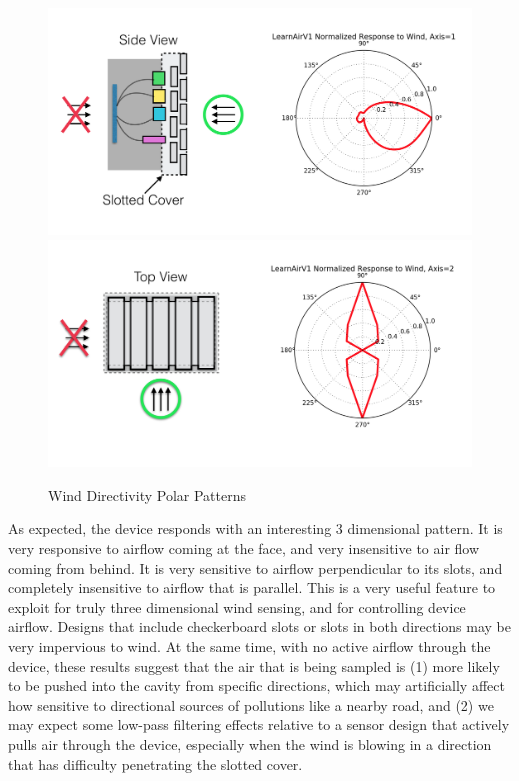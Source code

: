 \begin{figure}[htb]
 	\includegraphics[width=\textwidth]{figs/wind_polar_1}               
 	\includegraphics[width=\textwidth]{figs/wind_polar_2}               
 	 \caption{Wind Directivity Polar Patterns}
  	\label{fig:wind_polar}
\end{figure}

As expected, the device responds with an interesting 3 dimensional pattern.  It is very responsive to airflow coming at the face, and very insensitive to air flow coming from behind.  It is very sensitive to airflow perpendicular to its slots, and completely insensitive to airflow that is parallel.  This is a very useful feature to exploit for truly three dimensional wind sensing, and for controlling device airflow.  Designs that include checkerboard slots or slots in both directions may be very impervious to wind.  At the same time, with no active airflow through the device, these results suggest that the air that is being sampled is (1) more likely to be pushed into the cavity from specific directions, which may artificially affect how sensitive to directional sources of pollutions like a nearby road, and (2) we may expect some low-pass filtering effects relative to a sensor design that actively pulls air through the device, especially when the wind is blowing in a direction that has difficulty penetrating the slotted cover. 

